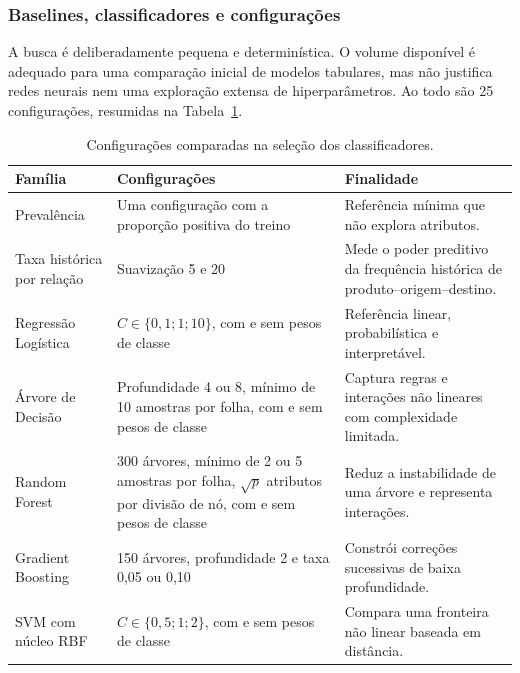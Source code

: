 \documentclass[12pt,a4paper]{article}
\begin{document}
\subsubsection{Baselines, classificadores e configurações}

A busca é deliberadamente pequena e determinística. O volume disponível é
adequado para uma comparação inicial de modelos tabulares, mas não justifica
redes neurais nem uma exploração extensa de hiperparâmetros. Ao todo são 25
configurações, resumidas na Tabela~\ref{tab:configuracoes-treinamento}.

\begin{table}[htbp]
    \centering
    \caption{Configurações comparadas na seleção dos classificadores.}
    \label{tab:configuracoes-treinamento}
    \scriptsize
    \begin{tabular}{p{3.4cm}p{6.0cm}p{5.3cm}}
        \toprule
        \textbf{Família} & \textbf{Configurações} & \textbf{Finalidade} \\
        \midrule
        Prevalência & Uma configuração com a proporção positiva do treino &
        Referência mínima que não explora atributos. \\

        Taxa histórica por relação & Suavização 5 e 20 &
        Mede o poder preditivo da frequência histórica de
        produto--origem--destino. \\

        Regressão Logística & $C\in\{0{,}1;1;10\}$, com e sem pesos de classe &
        Referência linear, probabilística e interpretável. \\

        Árvore de Decisão & Profundidade 4 ou 8, mínimo de 10 amostras por
        folha, com e sem pesos de classe &
        Captura regras e interações não lineares com complexidade limitada. \\

        Random Forest & 300 árvores, mínimo de 2 ou 5 amostras por folha,
        $\sqrt{p}$ atributos por divisão de nó, com e sem pesos de classe &
        Reduz a instabilidade de uma árvore e representa interações. \\

        Gradient Boosting & 150 árvores, profundidade 2 e taxa 0,05 ou 0,10 &
        Constrói correções sucessivas de baixa profundidade. \\

        SVM com núcleo RBF & $C\in\{0{,}5;1;2\}$, com e sem pesos de classe &
        Compara uma fronteira não linear baseada em distância. \\
        \bottomrule
    \end{tabular}
\end{table}
\end{document}
